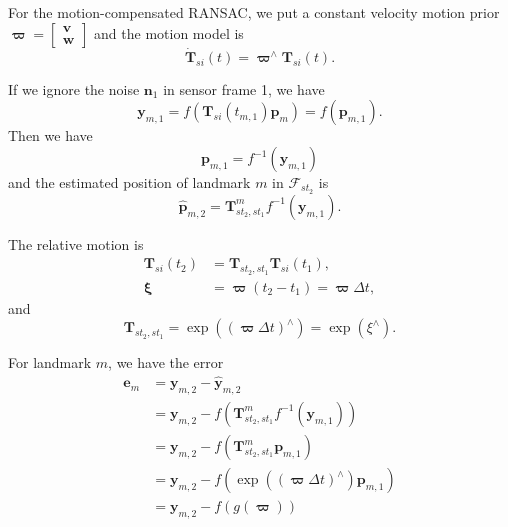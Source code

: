 For the motion-compensated RANSAC, we put a constant velocity motion prior $\bm{\varpi} = \begin{bmatrix} \mathbf{v} \\ \mathbf{w} \end{bmatrix}$ and the motion model is 
\begin{equation}
    \dot{\mathbf{T}}_{si}(t) = \bm{\varpi}^{\wedge} \mathbf{T}_{si}(t). 
\end{equation}

If we ignore the noise $\mathbf{n}_1$ in sensor frame 1, we have
\begin{equation}
    \mathbf{y}_{m,1} = f\left(\mathbf{T}_{si}(t_{m,1})\mathbf{p}_m\right) = f\left(\mathbf{p}_{m,1}\right).
\end{equation}
Then we have
\begin{equation}
    \mathbf{p}_{m,1} = f^{-1}\left(\mathbf{y}_{m,1}\right)
\end{equation}
and the estimated position of landmark $m$ in $\mathcal{F}_{st_2}$ is 
\begin{equation}
    \hat{\mathbf{p}}_{m,2} = \mathbf{T}_{st_2,st_1}^{m} f^{-1}\left(\mathbf{y}_{m,1}\right).
\end{equation}

The relative motion is 
\begin{equation}
    \begin{split}
    \mathbf{T}_{si}(t_2) &= \mathbf{T}_{st_2,st_1}\mathbf{T}_{si}(t_1), \\
    \bm{\xi} &= \bm{\varpi} (t_2 - t_1) = \bm{\varpi} \Delta t,
    \end{split}
\end{equation}
and 
\begin{equation}
    \mathbf{T}_{st_2,st_1} = \exp((\bm{\varpi} \Delta t)^{\wedge}) = \exp (\xi^{\wedge}).
\end{equation}

For landmark $m$, we have the error
\begin{equation}
    \begin{split}
    \mathbf{e}_m &= \mathbf{y}_{m,2} - \hat{\mathbf{y}}_{m,2}  \\
    &= \mathbf{y}_{m,2} - f\left(\mathbf{T}_{st_2,st_1}^{m} f^{-1}(\mathbf{y}_{m,1})\right) \\
    &= \mathbf{y}_{m,2} - f\left(\mathbf{T}_{st_2,st_1}^{m} \mathbf{p}_{m,1}\right) \\
    &= \mathbf{y}_{m,2} - f\left(\exp{((\bm{\varpi} \Delta t)^{\wedge})} \mathbf{p}_{m,1}\right) \\
    &= \mathbf{y}_{m,2} - f(g(\bm{\varpi}))
    \end{split}
\end{equation}

